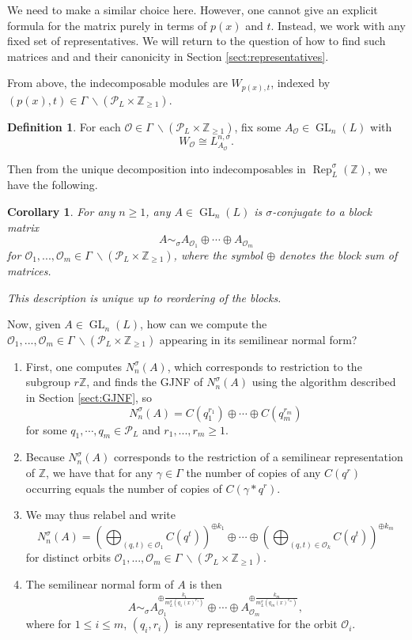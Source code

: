 \documentclass[10pt, reqno, hidelinks]{amsart}
\newcommand{\OO}{\mathcal{O}}
\DeclareMathOperator{\Rep}{Rep}
\DeclareMathOperator{\GL}{GL}
\newcommand{\bZ}{{\mathbb Z}}
\newcommand{\sP}{{\mathcal P}}
\numberwithin{thm}{subsection}
\newtheorem{cor}[thm]{Corollary}
\theoremstyle{definition}
\newtheorem{defn}[thm]{Definition}
\begin{document}
We need to make a similar choice here. However, one cannot give an explicit formula for the matrix purely in terms of $p(x)$ and $t$. Instead, we work with any fixed set of representatives. We will return to the question of how to find such matrices and and their canonicity in Section \ref{sect:representatives}. 

From above, the indecomposable modules are $W_{p(x),t}$, indexed by $(p(x),t) \in \Gamma \: \backslash (\sP_L \times \bZ_{\geq 1})$.

\begin{defn}
	For each $\OO \in \Gamma \: \backslash (\sP_L \times \bZ_{\geq 1})$, fix some $A_{\OO} \in \GL_n(L)$ with
	\[
	W_{\OO} \cong L^{n, \sigma}_{A_{\OO}}.
	\]
\end{defn}

Then from the unique decomposition into indecomposables in $\Rep_L^{\sigma}(\bZ)$, we have the following.

\begin{cor}\label{cor:SNF}
For any $n \geq 1$, any $A \in \GL_n(L)$ is $\sigma$-conjugate to a block matrix
\[
A \sim_{\sigma} A_{\OO_1} \oplus \cdots \oplus A_{\OO_m}
\]
for $\OO_1, ... , \OO_m \in \Gamma \: \backslash (\sP_L \times \bZ_{\geq 1})$, where the symbol $\oplus$ denotes the block sum of matrices.

This description is unique up to reordering of the blocks.
\end{cor}

Now, given $A \in \GL_n(L)$, how can we compute the $\OO_1, ... , \OO_m \in \Gamma \: \backslash (\sP_L \times \bZ_{\geq 1})$ appearing in its semilinear normal form? 

\begin{enumerate}
	\item 
First, one computes $N^{\sigma}_n(A)$, which corresponds to restriction to the subgroup $r \bZ$, and finds the GJNF of $N^{\sigma}_n(A)$ using the algorithm described in Section \ref{sect:GJNF}, so
\[
N^{\sigma}_n(A) = C(q_1^{r_1}) \oplus \cdots \oplus C(q_m^{r_m})
\]
for some $q_1, \cdots, q_m \in \sP_L$ and $r_1, ... , r_m \geq 1$.
\item Because $N^{\sigma}_n(A)$ corresponds to the restriction of a semilinear representation of $\bZ$, we have that for any $\gamma \in \Gamma$ the number of copies of any $C(q^r)$ occurring equals the number of copies of $C(\gamma * q^r)$.

\item We may thus relabel and write 
\[
N^{\sigma}_n(A) = \left( \bigoplus_{(q,t) \in \OO_1} C(q^{t}) \right)^{\oplus k_1} \oplus \cdots \oplus \left( \bigoplus_{(q,t) \in \OO_k} C(q^{t})\right)^{\oplus k_m}
\]
for distinct orbits $\OO_1, ... , \OO_m \in \Gamma \: \backslash (\sP_L \times \bZ_{\geq 1})$.

\item The semilinear normal form of $A$ is then
\[
A \sim_{\sigma} A_{\OO_1}^{\oplus \frac{k_1}{m^{\sigma}_L(q_1(x)^{r_1})}} \oplus \cdots \oplus A_{\OO_m}^{\oplus \frac{k_m}{m^{\sigma}_L(q_m(x)^{r_m})}},
\]
where for $1 \leq i \leq m$, $(q_i,r_i)$ is any representative for the orbit $\OO_i$.
\end{enumerate}
\end{document}
